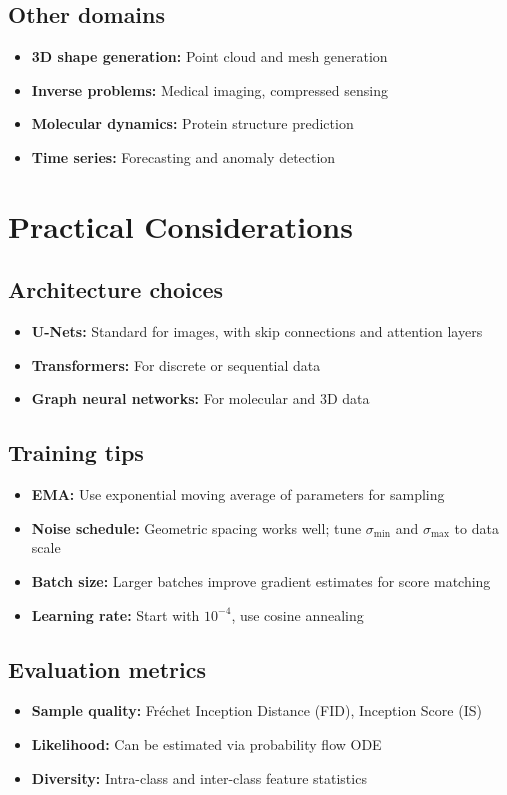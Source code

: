 \documentclass[11pt]{article}
\theoremstyle{definition}
\begin{document}
\subsection{Other domains}
\begin{itemize}
\item \textbf{3D shape generation:} Point cloud and mesh generation
\item \textbf{Inverse problems:} Medical imaging, compressed sensing
\item \textbf{Molecular dynamics:} Protein structure prediction
\item \textbf{Time series:} Forecasting and anomaly detection
\end{itemize}

\section{Practical Considerations}

\subsection{Architecture choices}
\begin{itemize}
\item \textbf{U-Nets:} Standard for images, with skip connections and attention layers
\item \textbf{Transformers:} For discrete or sequential data
\item \textbf{Graph neural networks:} For molecular and 3D data
\end{itemize}

\subsection{Training tips}
\begin{itemize}
\item \textbf{EMA:} Use exponential moving average of parameters for sampling
\item \textbf{Noise schedule:} Geometric spacing works well; tune $\sigma_{\min}$ and $\sigma_{\max}$ to data scale
\item \textbf{Batch size:} Larger batches improve gradient estimates for score matching
\item \textbf{Learning rate:} Start with $10^{-4}$, use cosine annealing
\end{itemize}

\subsection{Evaluation metrics}
\begin{itemize}
\item \textbf{Sample quality:} Fréchet Inception Distance (FID), Inception Score (IS)
\item \textbf{Likelihood:} Can be estimated via probability flow ODE
\item \textbf{Diversity:} Intra-class and inter-class feature statistics
\end{itemize}
\end{document}
